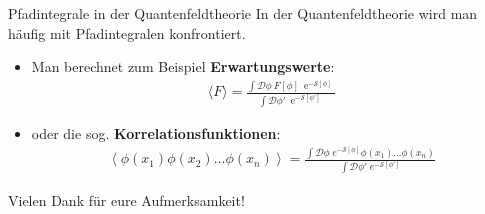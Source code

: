 \begin{frame}{Pfadintegrale in der Quantenfeldtheorie}
In der Quantenfeldtheorie wird man häufig mit Pfadintegralen konfrontiert. \\
\begin{itemize}
	\item Man berechnet zum Beispiel \textbf{Erwartungswerte}:
\begin{align*}
	\langle F \rangle = \frac{\int\mathcal{D}\phi \ F[\phi]\ \operatorname{e}^{-\mathcal{S}[\phi]}}{\int\mathcal{D}\phi' \ \operatorname{e}^{-\mathcal{S}[\phi']}}
\end{align*}
\item oder die sog. \textbf{Korrelationsfunktionen}:
\begin{align*}
\left\langle \phi(x_1) \phi(x_2) \ldots \phi(x_n)\right\rangle
=\frac{\int \mathcal D \phi \; e^{-\mathcal{S}[\phi]}\phi(x_1)\ldots \phi(x_n)}{\int \mathcal D \phi' \; e^{-\mathcal{S}[\phi']}}
\end{align*}
\end{itemize}
\end{frame}

\begin{frame}
\begin{block}{\hfill \Large Vielen Dank für eure Aufmerksamkeit! \hfill}
	
\end{block}

\end{frame}